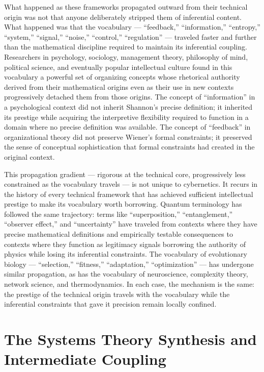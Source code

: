 \documentclass[12pt, openright, twoside]{book}
\begin{document}
What happened as these frameworks propagated outward from their technical
origin was not that anyone deliberately stripped them of inferential content.
What happened was that the vocabulary --- ``feedback,'' ``information,''
``entropy,'' ``system,'' ``signal,'' ``noise,'' ``control,'' ``regulation''
--- traveled faster and further than the mathematical discipline required to
maintain its inferential coupling. Researchers in psychology, sociology,
management theory, philosophy of mind, political science, and eventually popular
intellectual culture found in this vocabulary a powerful set of organizing
concepts whose rhetorical authority derived from their mathematical origins
even as their use in new contexts progressively detached them from those
origins. The concept of ``information'' in a psychological context did not
inherit Shannon's precise definition; it inherited its prestige while acquiring
the interpretive flexibility required to function in a domain where no precise
definition was available. The concept of ``feedback'' in organizational theory
did not preserve Wiener's formal constraints; it preserved the sense of
conceptual sophistication that formal constraints had created in the original
context.

This propagation gradient --- rigorous at the technical core, progressively
less constrained as the vocabulary travels --- is not unique to cybernetics.
It recurs in the history of every technical framework that has achieved
sufficient intellectual prestige to make its vocabulary worth borrowing. Quantum
terminology has followed the same trajectory: terms like ``superposition,''
``entanglement,'' ``observer effect,'' and ``uncertainty'' have traveled from
contexts where they have precise mathematical definitions and empirically
testable consequences to contexts where they function as legitimacy signals
borrowing the authority of physics while losing its inferential constraints.
The vocabulary of evolutionary biology --- ``selection,'' ``fitness,''
``adaptation,'' ``optimization'' --- has undergone similar propagation, as has
the vocabulary of neuroscience, complexity theory, network science, and
thermodynamics. In each case, the mechanism is the same: the prestige of
the technical origin travels with the vocabulary while the inferential
constraints that gave it precision remain locally confined.

\section{The Systems Theory Synthesis and Intermediate Coupling}
\end{document}
